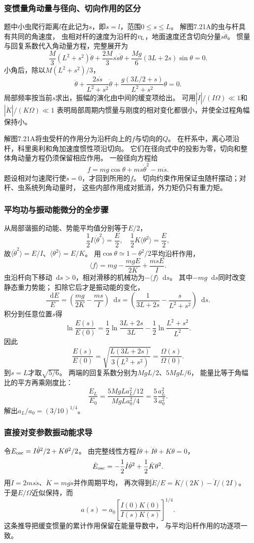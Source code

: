 \documentclass[UTF8,fontset=fandol,a4paper,11pt]{ctexart}
\newcommand{\dd}{\mathop{}\!\mathrm{d}}
\begin{document}
\subsubsection*{变惯量角动量与径向、切向作用的区分}
题中小虫爬行距离$l$在此记为$s$，即$s=l$，范围$0\le s\le L$。
解图7.21A的虫与杆具有共同的角速度，
虫相对杆的速度为沿杆的$v_{\rm L}$，地面速度还含切向分量$s\dot\theta$。
惯量与回复系数代入角动量方程，完整展开为
\[
\frac M3(L^2+s^2)\ddot\theta
+\frac{2M}{3}s\dot s\dot\theta
+\frac{Mg}{6}(3L+2s)\sin\theta=0.
\]
小角后，除以$M(L^2+s^2)/3$，
\[
\ddot\theta+\frac{2s\dot s}{L^2+s^2}\dot\theta
+\frac{g(3L/2+s)}{L^2+s^2}\theta=0.
\]
局部频率按当前$s$求出，振幅的演化由中间的缓变项给出。
可用$|\dot I|/(I\Omega)\ll1$和$|\dot K|/(K\Omega)\ll1$
表明局部周期内惯量与刚度的相对变化都很小，并使全过程角幅保持小。

解图7.21A将虫受杆的作用分为沿杆向上的$f$与切向的$Q$。
在杆系中，离心项沿杆，科里奥利和角加速度惯性项沿切向。
它们在径向式中的投影为零，切向和整体角动量方程仍须保留相应作用。
一般径向方程给
\[
f=mg\cos\theta+ms\dot\theta^2-m\ddot s.
\]
题设相对匀速爬行使$\ddot s=0$，才回到所用的$f$。
切向约束作用保证虫随杆摆动；对杆、虫系统列角动量时，
这些内部作用成对抵消，外力矩仍只有重力矩。

\subsubsection*{平均功与振动能微分的全步骤}
从局部谐振的动能、势能平均值分别等于$E/2$，
\[
\frac12I\langle\dot\theta^2\rangle=\frac E2,
\quad\frac12K\langle\theta^2\rangle=\frac E2,
\]
故$\langle\dot\theta^2\rangle=E/I$、$\langle\theta^2\rangle=E/K$。
用$\cos\theta\simeq1-\theta^2/2$平均沿杆作用，
\[
\langle f\rangle=mg-\frac{mgE}{2K}+\frac{msE}{I}.
\]
虫沿杆向下移动$\dd s>0$，相对滑移的机械功为$-\langle f\rangle\dd s$。
其中$-mg\dd s$同时改变静态重力势能；
扣除它后才是振动能的变化，
\[
\frac{\dd E}{E}=\left(\frac{mg}{2K}-\frac{ms}{I}\right)\dd s
=\left(\frac1{3L+2s}-\frac{s}{L^2+s^2}\right)\dd s.
\]
积分到任意位置$s$得
\[
\ln\frac{E(s)}{E(0)}
=\frac12\ln\frac{3L+2s}{3L}
-\frac12\ln\frac{L^2+s^2}{L^2}.
\]
因此
\[
\frac{E(s)}{E(0)}=
\sqrt{\frac{L(3L+2s)}{3(L^2+s^2)}}
=\frac{\Omega(s)}{\Omega(0)}.
\]
到$s=L$才取$\sqrt{5/6}$。
两端的回复系数分别为$MgL/2$、$5MgL/6$，
能量比等于角幅比的平方再乘刚度比：
\[
\frac{E_L}{E_0}=\frac{5MgLa_L^2/12}{MgLa_0^2/4}
=\frac53\frac{a_L^2}{a_0^2}.
\]
解出$a_L/a_0=(3/10)^{1/4}$。

\subsubsection*{直接对变参数振动能求导}
令$E_{\rm osc}=I\dot\theta^2/2+K\theta^2/2$。
由完整线性方程$I\ddot\theta+\dot I\dot\theta+K\theta=0$，
\[
\dot E_{\rm osc}
=-\frac12\dot I\dot\theta^2+\frac12\dot K\theta^2.
\]
用$\dot I=2ms\dot s$、$\dot K=mg\dot s$并作周期平均，
再次得到$\dot E/E=\dot K/(2K)-\dot I/(2I)$。
于是$E/\Omega$近似保持，而
\[
a(s)=a_0\left[\frac{I(0)K(0)}{I(s)K(s)}\right]^{1/4}.
\]
这条推导把缓变惯量的累计作用保留在能量导数中，
与平均沿杆作用的功逐项一致。
\end{document}
